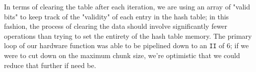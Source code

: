 \documentclass{article}
\begin{document}
\newline\newline
In terms of clearing the table after each iteration, we are using an array of "valid bits" to keep track of the "validity" of each entry in the hash table; in this fashion, the process of clearing the data should involve significantly fewer operations than trying to set the entirety of the hash table memory.
\newline\newline
The primary loop of our hardware function was able to be pipelined down to an \texttt{II} of $6$; if we were to cut down on the maximum chunk size, we're optimistic that we could reduce that further if need be.


\begin{appendices}
%
%
%


\end{appendices}
\end{document}

